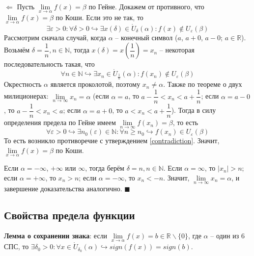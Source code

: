 \documentclass[12pt, a4paper, reqno]{article}
\begin{document}
    $\boxed{\Leftarrow}$ Пусть $\lim\limits_{x\to\alpha} f(x) = \beta$ по Гейне. Докажем от противного,
    что $\lim\limits_{x\to\alpha} f(x) = \beta$ по Коши. Если это не так, то
    \begin{equation*}
        \exists\varepsilon > 0: \forall\delta > 0 \hookrightarrow \exists x(\delta)\in \mathring
        U_{\delta}(\alpha): f(x) \not\in U_{\varepsilon}(\beta)
    \end{equation*}
    Рассмотрим сначала случай, когда $\alpha$ -- конечный символ ($a$, $a + 0$, $a - 0$;
    $a\in\mathbb{R}$). Возьмём $\delta = \dfrac{1}{n}, n\in\mathbb{N}$, тогда
    $x(\delta) = x\left(\dfrac{1}{n}\right) = x_n$ -- некоторая последовательность такая, что
    \begin{equation}\label{contradiction}
        \forall n\in\mathbb{N} \hookrightarrow \exists x_n\in \mathring U_{\frac{1}{n}}(\alpha):
        f(x_n) \not\in U_{\varepsilon}(\beta)
    \end{equation}
    Окрестность $\alpha$ является проколотой, поэтому $x_n \neq \alpha$. Также по теореме о двух
    милиционерах: $\lim\limits_{n\to\infty} x_n = \alpha$ (если $\alpha = a$, то $a - \dfrac{1}{n}
    < x_n < a + \dfrac{1}{n}$; если $\alpha = a - 0$, то $a - \dfrac{1}{n} < x_n < a$; если
    $\alpha = a + 0$, то $a < x_n < a + \dfrac{1}{n}$). Тогда в силу определения предела по Гейне
    имеем $\lim\limits_{n\to\infty} f(x_n) = \beta$, то есть
    \begin{equation*}
        \forall\varepsilon > 0 \hookrightarrow\exists n_0(\varepsilon)\in\mathbb{N}: \forall n
        \geq n_0 \hookrightarrow f(x_n)\in U_{\varepsilon}(\beta)
    \end{equation*}
    То есть возникло противоречие с утверждением \eqref{contradiction}. Значит,
    $\lim\limits_{x\to\alpha} f(x) = \beta$ по Коши.

    Если $\alpha = -\infty$, $+\infty$ или $\infty$, тогда берём $\delta = n, n\in\mathbb{N}$.
    Если $\alpha = \infty$, то $|x_n| > n$; если $\alpha = +\infty$, то $x_n > n$; если
    $\alpha = -\infty$, то $x_n < -n$. Значит, $\lim\limits_{n\to\infty} x_n = \alpha$, и завершение
    доказательства аналогично. $\blacksquare$

\subsection{Свойства предела функции}

    \textbf{Лемма о сохранении знака}: если $\lim\limits_{x\to\alpha} f(x) =
    b\in\mathbb{R}\backslash\{0\}$, где $\alpha$ -- один из 6 СПС, то $\exists\delta_0 > 0:
    \forall x\in \mathring U_{\delta_0}(\alpha) \hookrightarrow sign(f(x)) = sign(b)$.
\end{document}
